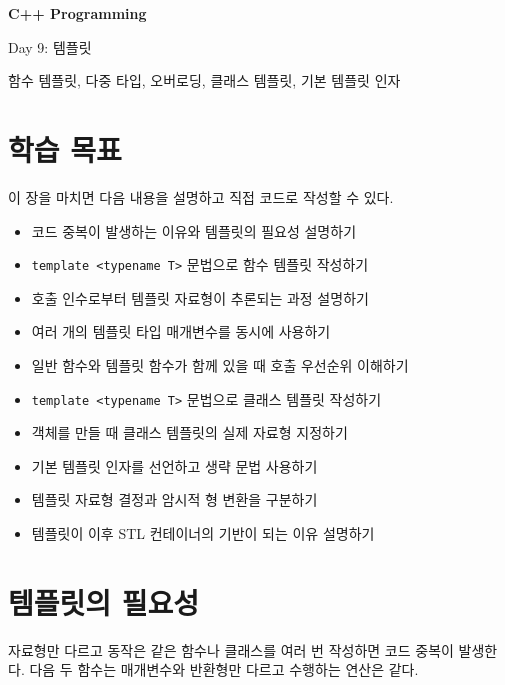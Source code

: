 \documentclass[11pt,a4paper]{article}
\begin{document}
\begin{titlepage}
    \centering
    \vspace*{3cm}
    {\Huge\bfseries C++ Programming\par}
    \vspace{0.8cm}
    {\LARGE Day 9: 템플릿\par}
    \vspace{2cm}
    {\large 함수 템플릿, 다중 타입, 오버로딩, 클래스 템플릿, 기본 템플릿 인자\par}
    \vfill
\end{titlepage}

\tableofcontents
\newpage

\section{학습 목표}
\begin{learningbox}
이 장을 마치면 다음 내용을 설명하고 직접 코드로 작성할 수 있다.
\begin{itemize}[leftmargin=1.5em]
    \item 코드 중복이 발생하는 이유와 템플릿의 필요성 설명하기
    \item \texttt{template <typename T>} 문법으로 함수 템플릿 작성하기
    \item 호출 인수로부터 템플릿 자료형이 추론되는 과정 설명하기
    \item 여러 개의 템플릿 타입 매개변수를 동시에 사용하기
    \item 일반 함수와 템플릿 함수가 함께 있을 때 호출 우선순위 이해하기
    \item \texttt{template <typename T>} 문법으로 클래스 템플릿 작성하기
    \item 객체를 만들 때 클래스 템플릿의 실제 자료형 지정하기
    \item 기본 템플릿 인자를 선언하고 생략 문법 사용하기
    \item 템플릿 자료형 결정과 암시적 형 변환을 구분하기
    \item 템플릿이 이후 STL 컨테이너의 기반이 되는 이유 설명하기
\end{itemize}
\end{learningbox}

\section{템플릿의 필요성}
자료형만 다르고 동작은 같은 함수나 클래스를 여러 번 작성하면 코드 중복이 발생한다. 다음 두 함수는 매개변수와 반환형만 다르고 수행하는 연산은 같다.
\end{document}
